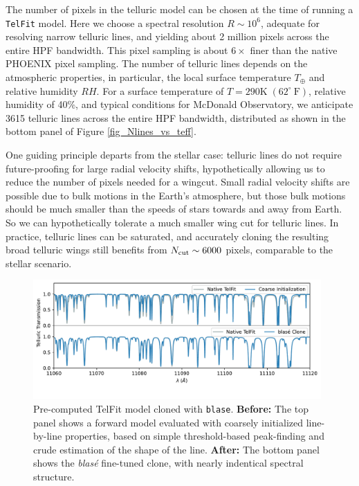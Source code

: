 \documentclass[twocolumn]{aastex631}
\begin{document}
The number of pixels in the telluric model can be chosen at the time of running a \texttt{TelFit} model.  Here we choose a spectral resolution $R\sim10^6$, adequate for resolving narrow telluric lines, and yielding about 2 million pixels across the entire HPF bandwidth.  This pixel sampling is about $6\times$ finer than the native PHOENIX pixel sampling.  The number of telluric lines depends on the atmospheric properties, in particular, the local surface temperature $T_\oplus$ and relative humidity $RH$.  For a surface temperature of $T=290 \mathrm{K}\; (62^\circ~\mathrm{F})$, relative humidity of 40\%, and typical conditions for McDonald Observatory, we anticipate 3615 telluric lines across the entire HPF bandwidth, distributed as shown in the bottom panel of Figure \ref{fig_Nlines_vs_teff}.

One guiding principle departs from the stellar case: telluric lines do not require future-proofing for large radial velocity shifts, hypothetically allowing us to reduce the number of pixels needed for a wingcut.  Small radial velocity shifts are possible due to bulk motions in the Earth's atmosphere, but those bulk motions should be much smaller than the speeds of stars towards and away from Earth.  So we can hypothetically tolerate a much smaller wing cut for telluric lines.  In practice, telluric lines can be saturated, and accurately cloning the resulting broad telluric wings still benefits from $N_{\rm cut}\sim6000$ pixels, comparable to the stellar scenario.

\begin{figure}[hbt!]
    \centering
    \includegraphics[width=0.98\textwidth]{figures/TelFit_clone_2panel.pdf}
    \caption{Pre-computed TelFit model cloned with \texttt{blase}.  \textbf{Before:} The top panel shows a forward model evaluated with coarsely initialized line-by-line properties, based on simple threshold-based peak-finding and crude estimation of the shape of the line.  \textbf{After:} The bottom panel shows the \emph{blas\'e} fine-tuned clone, with nearly indentical spectral structure.}
    \label{fig_telluric_clone}
\end{figure}
\end{document}
